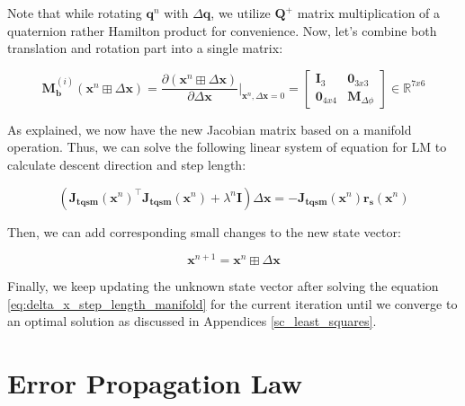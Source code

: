 \documentclass[12pt]{report}
\numberwithin{figure}{section}
\newcommand{\R}{\mathbb{R}}
\begin{document}
\begin{appendices}
Note that while rotating $\mathbf{q}^n$ with $\Delta \mathbf{\mathbf{q}}$, 
we utilize $\mathbf{Q}^{+}$ matrix multiplication of a quaternion rather Hamilton product 
for convenience.
Now, let's combine both translation and rotation part into a single matrix:

\begin{equation}
\mathbf{M}_{\mathbf{b}}^{(i)}(\mathbf{x}^n \boxplus \Delta \mathbf{x}) = 
    \frac{\partial (\mathbf{x}^n \boxplus \Delta \mathbf{x})}
  {\partial \Delta \mathbf{x}} \bigg|_{\mathbf{x}^n,\Delta \mathbf{x}=0} = 
  \begin{bmatrix} 
  \mathbf{I}_3 & \mathbf{0}_{3x3} \\ 
  \mathbf{0}_{4x4} & \mathbf{M}_{\Delta \phi}   
  \end{bmatrix}
  \in \R^{7x6}
\end{equation}

As explained, we now have the new Jacobian matrix based on a manifold operation.
Thus, we can solve the following linear system of equation for LM 
to calculate descent direction and step length:

\begin{equation}\label{eq:delta_x_step_length_manifold}
  (\mathbf{J_{tqsm}}(\mathbf{x}^n)^\top\mathbf{J_{tqsm}}(\mathbf{x}^n) 
  + \lambda^n \mathbf{I})
  \Delta \mathbf{x} =  
  -\mathbf{J_{tqsm}}(\mathbf{x}^n)\mathbf{r_s}(\mathbf{x}^n)
\end{equation}

Then, we can add corresponding small changes to the new state vector:

\begin{equation}
  \mathbf{x}^{n+1} = \mathbf{x}^{n} \boxplus \Delta \mathbf{x}
\end{equation}

Finally, we keep updating the unknown state vector after solving 
the equation \eqref{eq:delta_x_step_length_manifold} for the current iteration 
until we converge to an optimal solution as discussed in Appendices 
\ref{sc_least_squares}.

\section{Error Propagation Law} \label{sc_error_prop_law}


\end{appendices}
\end{document}
